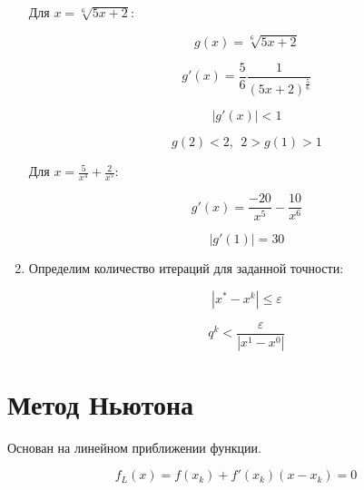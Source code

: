 \documentclass[10pt,a4paper]{article}
\begin{document}
\begin{enumerate}
		Для $x = \sqrt[6]{5x + 2}$:
		
		\begin{equation}
			g\left(x\right) = \sqrt[6]{5x + 2}
		\end{equation}
		
		\begin{equation}
			g'\left(x\right) = \frac{5}{6} \frac{1}
			{\left(5x + 2\right)^{\frac{5}{6}}}
		\end{equation}
		
		\begin{equation}
			\left|g'\left(x\right)\right| < 1
		\end{equation}
		
		\begin{equation}
			g\left(2\right) < 2, \ \ 2 > g\left(1\right) > 1
		\end{equation}
		
		Для $x = \frac{5}{x^{4}} + \frac{2}{x^{5}}$:
		
		\begin{equation}
			g'\left(x\right) = \frac{-20}{x^{5}} - \frac{10}{x^{6}}
		\end{equation}
		
		\begin{equation}
			\left|g'\left(1\right)\right| = 30
		\end{equation}
		
		\item Определим количество итераций для заданной точности:
		
		\begin{equation}
			\left|x^{*} - x^{k}\right| \leqslant \varepsilon	
		\end{equation}				
		
		\begin{equation}
			q^{k} < \frac{\varepsilon}{\left|x^{1} - x^{0}\right|}
		\end{equation}
	\end{enumerate}
	
	\section{Метод Ньютона}
	
		Основан на линейном приближении функции.
		
		\begin{equation}
			f_{L}\left(x\right) = f\left(x_{k}\right) + f'\left(x_{k}\right)
			\left(x - x_{k}\right) = 0
		\end{equation}
		
\end{document}
